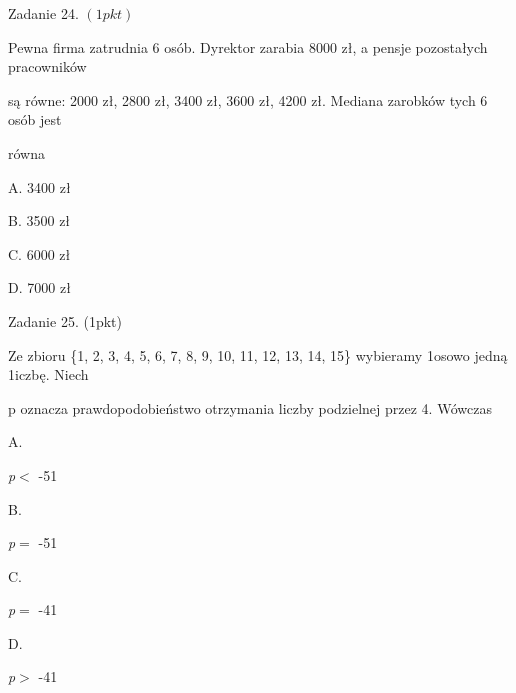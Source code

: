 \documentclass[a4paper,12pt]{article}
\begin{document}
Zadanie 24. $(1pkt)$

Pewna firma zatrudnia 6 osób. Dyrektor zarabia 8000 zł, a pensje pozostałych pracowników

są równe: 2000 zł, 2800 zł, 3400 zł, 3600 zł, 4200 zł. Mediana zarobków tych 6 osób jest

równa

A. 3400 zł

B. 3500 zł

C. 6000 zł

D. 7000 zł

Zadanie 25. (1pkt)

Ze zbioru \{1, 2, 3, 4, 5, 6, 7, 8, 9, 10, 11, 12, 13, 14, 15\} wybieramy 1osowo jedną 1iczbę. Niech

p oznacza prawdopodobieństwo otrzymania liczby podzielnej przez 4. Wówczas

A.

{\it p}$<$ -51

B.

{\it p}$=$ -51

C.

{\it p}$=$ -41

D.

{\it p}$>$ -41
\end{document}

